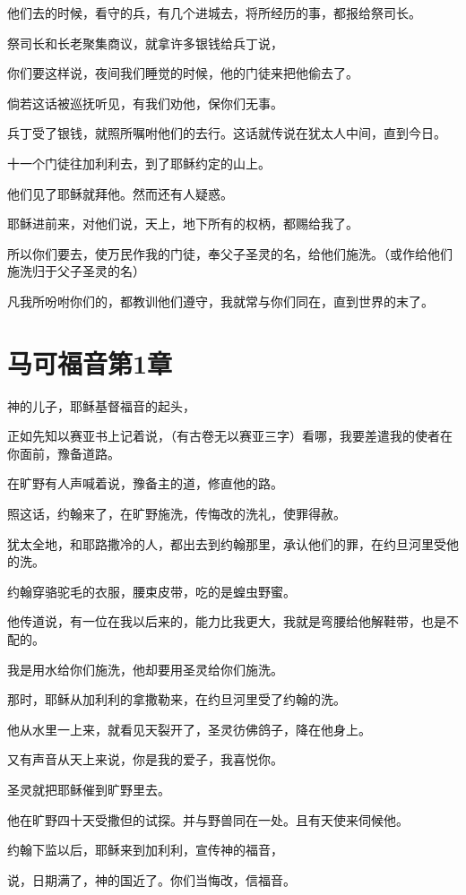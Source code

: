 \documentclass[12pt,oneside]{book}
\begin{document}
他们去的时候，看守的兵，有几个进城去，将所经历的事，都报给祭司长。

祭司长和长老聚集商议，就拿许多银钱给兵丁说，

你们要这样说，夜间我们睡觉的时候，他的门徒来把他偷去了。

倘若这话被巡抚听见，有我们劝他，保你们无事。

兵丁受了银钱，就照所嘱咐他们的去行。这话就传说在犹太人中间，直到今日。

十一个门徒往加利利去，到了耶稣约定的山上。

他们见了耶稣就拜他。然而还有人疑惑。

耶稣进前来，对他们说，天上，地下所有的权柄，都赐给我了。

所以你们要去，使万民作我的门徒，奉父子圣灵的名，给他们施洗。（或作给他们施洗归于父子圣灵的名）

凡我所吩咐你们的，都教训他们遵守，我就常与你们同在，直到世界的末了。

\chapter{马可福音第1章}
神的儿子，耶稣基督福音的起头，

正如先知以赛亚书上记着说，（有古卷无以赛亚三字）看哪，我要差遣我的使者在你面前，豫备道路。

在旷野有人声喊着说，豫备主的道，修直他的路。

照这话，约翰来了，在旷野施洗，传悔改的洗礼，使罪得赦。

犹太全地，和耶路撒冷的人，都出去到约翰那里，承认他们的罪，在约旦河里受他的洗。

约翰穿骆驼毛的衣服，腰束皮带，吃的是蝗虫野蜜。

他传道说，有一位在我以后来的，能力比我更大，我就是弯腰给他解鞋带，也是不配的。

我是用水给你们施洗，他却要用圣灵给你们施洗。

那时，耶稣从加利利的拿撒勒来，在约旦河里受了约翰的洗。

他从水里一上来，就看见天裂开了，圣灵彷佛鸽子，降在他身上。

又有声音从天上来说，你是我的爱子，我喜悦你。

圣灵就把耶稣催到旷野里去。

他在旷野四十天受撒但的试探。并与野兽同在一处。且有天使来伺候他。

约翰下监以后，耶稣来到加利利，宣传神的福音，

说，日期满了，神的国近了。你们当悔改，信福音。
\end{document}
